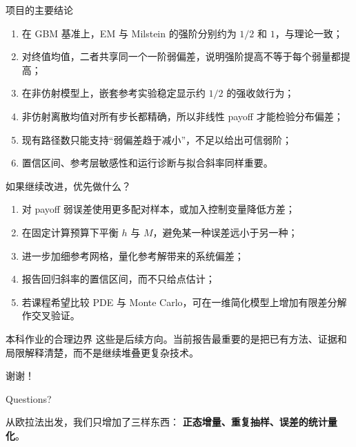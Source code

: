 \documentclass[aspectratio=169,10pt,fontset=none]{ctexbeamer}
\begin{document}
\begin{frame}{项目的主要结论}
  \begin{enumerate}
    \item 在 GBM 基准上，EM 与 Milstein 的强阶分别约为 $1/2$ 和 $1$，与理论一致；
    \item 对终值均值，二者共享同一个一阶弱偏差，说明强阶提高不等于每个弱量都提高；
    \item 在非仿射模型上，嵌套参考实验稳定显示约 $1/2$ 的强收敛行为；
    \item 非仿射离散均值对所有步长都精确，所以非线性 payoff 才能检验分布偏差；
    \item 现有路径数只能支持“弱偏差趋于减小”，不足以给出可信弱阶；
    \item 置信区间、参考层敏感性和运行诊断与拟合斜率同样重要。
  \end{enumerate}
\end{frame}

\begin{frame}{如果继续改进，优先做什么？}
  \begin{enumerate}
    \item 对 payoff 弱误差使用更多配对样本，或加入控制变量降低方差；
    \item 在固定计算预算下平衡 $h$ 与 $M$，避免某一种误差远小于另一种；
    \item 进一步加细参考网格，量化参考解带来的系统偏差；
    \item 报告回归斜率的置信区间，而不只给点估计；
    \item 若课程希望比较 PDE 与 Monte Carlo，可在一维简化模型上增加有限差分解作交叉验证。
  \end{enumerate}
  \begin{block}{本科作业的合理边界}
    这些是后续方向。当前报告最重要的是把已有方法、证据和局限解释清楚，而不是继续堆叠更复杂技术。
  \end{block}
\end{frame}

\begin{frame}[plain]
  \vfill
  \centering
  {\Huge\color{CourseNavy}谢谢！}

  \vspace{1em}
  {\Large Questions?}

  \vspace{2em}
  \begin{minipage}{0.78\textwidth}
    \centering
    \color{CourseTeal}
    从欧拉法出发，我们只增加了三样东西：
    \textbf{正态增量、重复抽样、误差的统计量化}。
  \end{minipage}
  \vfill
\end{frame}
\end{document}
